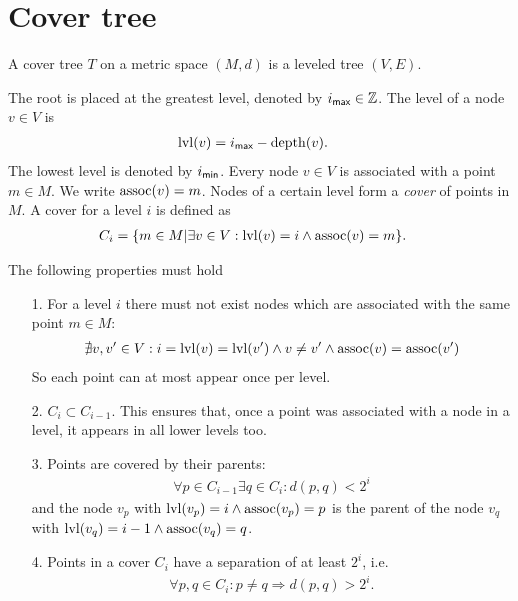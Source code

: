 \section{Cover tree}
	\begin{mydef}\label{coverTree}
		A \textnormal{cover tree} $T$ on a metric space $(M, d)$ is a leveled tree $(V, E)$.
		
		The root is placed at the greatest level, denoted by $i_{\textsf{max}} \in \mathbb{Z}$.
		The level of a node $v \in V$ is
		\begin{align*}
			\operatorname{lvl}(v)	&= i_{\textsf{max}} - \operatorname{depth}(v).
		\end{align*}
		The lowest level is denoted by $i_{\textsf{min}}$.
		Every node $v \in V$ is associated with a point $m \in M$. We write $\operatorname{assoc}(v) = m$.
		Nodes of a certain level form a \textit{cover} of points in $M$. A cover for a level $i$ is defined as
		\begin{align*}
			C_i	&= \{m \in M | \exists v \in V : \operatorname{lvl}(v) = i \land \operatorname{assoc}(v) = m\}.
		\end{align*}
		
		The following properties must hold
		\begin{itemize}
			\item[1.] For a level $i$ there must not exist nodes which are associated with the same point $m \in M$:
				\begin{align*}
					\nexists v, v' \in V : i = \operatorname{lvl}(v) = \operatorname{lvl}(v') \land v \neq v' \land \operatorname{assoc}(v) = \operatorname{assoc}(v')
				\end{align*}
				So each point can at most appear once per level.
			\item[2.] $C_i \subset C_{i - 1}$. This ensures that, once a point was associated with a node in a
				level, it appears in all lower levels too.
			\item[3.] Points are covered by their parents:
				\begin{align*}
					\forall p \in C_{i - 1} \exists q \in C_{i}: d(p, q) < 2^i
				\end{align*}
				and the node $v_p$ with $\operatorname{lvl}(v_p) = i \land \operatorname{assoc}(v_p) = p$ is the parent of the node
				$v_q$ with $\operatorname{lvl}(v_q) = i - 1 \land \operatorname{assoc}(v_q) = q$.
			\item[4.] Points in a cover $C_i$ have a separation of at least $2^i$, i.e.
				\begin{align*}
					\forall p, q \in C_i : p \neq q \Rightarrow d(p, q) > 2^i.
				\end{align*}
		\end{itemize}
	\end{mydef}
